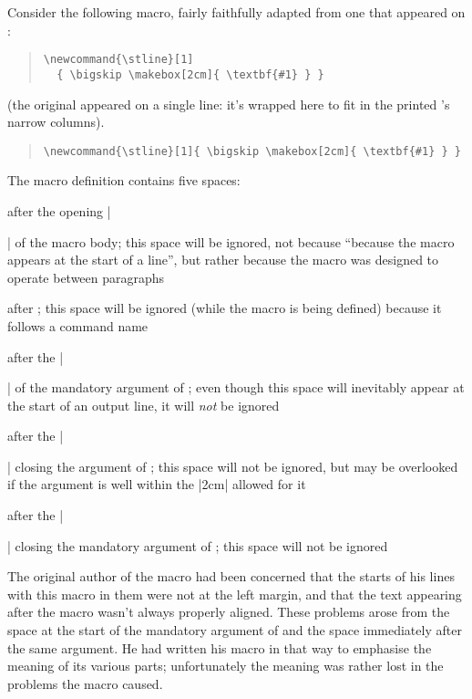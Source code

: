 Consider the following macro, fairly faithfully adapted from one that
appeared on :
\begin{narrowversion}
\begin{quote}
\begin{verbatim}
\newcommand{\stline}[1]
  { \bigskip \makebox[2cm]{ \textbf{#1} } }
\end{verbatim}
\end{quote}
(the original appeared on a single line: it's wrapped here to fit in
the printed 's narrow columns).

\nothtml{\noindent}
\end{narrowversion}
\begin{wideversion}
\begin{quote}
\begin{verbatim}
\newcommand{\stline}[1]{ \bigskip \makebox[2cm]{ \textbf{#1} } }
\end{verbatim}
\end{quote}
\end{wideversion}
The macro definition contains five spaces:
\begin{itemize}
\item after the opening |{| of the macro body; this space will be
  ignored, not because ``because the macro appears at the start of a
  line'', but rather because the macro was designed to operate between
  paragraphs
\item after ; this space will be ignored (while the macro
  is being defined) because it follows a command name
\item after the |{| of the mandatory argument of ; even
  though this space will inevitably appear at the start of an output
  line, it will \emph{not} be ignored
\item after the |}| closing the argument of ; this space
  will not be ignored, but may be overlooked if the argument is well
  within the |2cm| allowed for it
\item after the |}| closing the mandatory argument of ;
  this space will not be ignored
\end{itemize}
The original author of the macro had been concerned that the starts of
his lines with this macro in them were not at the left margin, and
that the text appearing after the macro wasn't always properly
aligned.  These problems arose from the space at the start of the
mandatory argument of  and the space immediately after the
same argument.  He had written his macro in that way to emphasise the
meaning of its various parts; unfortunately the meaning was rather
lost in the problems the macro caused.

